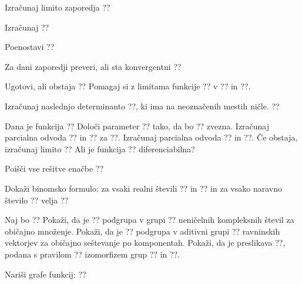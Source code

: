 \documentclass[a4paper,12pt]{article}
\begin{document}
\begin{enumerate}
Izračunaj limito zaporedja
??

Izračunaj
??

Poenostavi
??

Za dani zaporedji preveri, ali sta konvergentni
??

Ugotovi, ali obstaja
??
Pomagaj si z limitama funkcije ?? v ?? in ??.

Izračunaj naslednjo determinanto ??, ki ima na neoznačenih mestih ničle.
??

Dana je funkcija
??
Določi parameter ?? tako, da bo ?? zvezna.
Izračunaj parcialna odvoda ?? in ?? za ??.
Izračunaj parcialna odvoda ?? in ??.
Če obstaja, izračunaj limito
??
Ali je funkcija ?? diferenciabilna?

Poišči vse rešitve enačbe
??

Dokaži binomsko formulo: za vsaki realni števili ?? in ?? in za vsako naravno število ?? velja
??

Naj bo
??
Pokaži, da je ?? podgrupa v grupi ??
neničelnih kompleksnih števil za običajno množenje.
Pokaži, da je ?? podgrupa v aditivni grupi ??
ravninskih vektorjev za običajno seštevanje po komponentah.
Pokaži, da je preslikava ??, podana s pravilom
??
izomorfizem grup ?? in ??.

Nariši grafe funkcij:
??

\end{enumerate}
\end{document}
